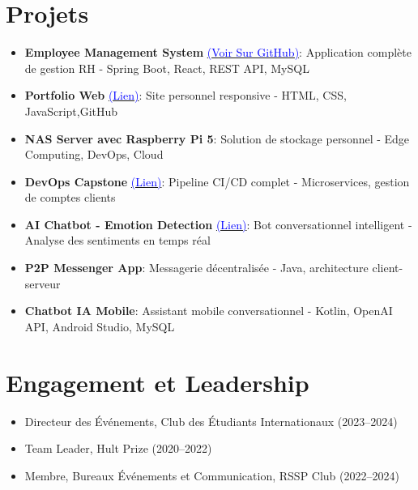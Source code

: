 \documentclass[10pt, letterpaper]{article}
\begin{document}
\section*{Projets}
\begin{itemize}[leftmargin=*, topsep=2pt, itemsep=1pt]
\item \textbf{Employee Management System} \href{https://github.com/MendDevs/employee-management-app-fullstack}{\textcolor{blue}{(Voir Sur GitHub)}}: Application complète de gestion RH - Spring Boot, React, REST API, MySQL
\item \textbf{Portfolio Web} \href{https://menddevs.github.io}{\textcolor{blue}{(Lien)}}: Site personnel responsive - HTML, CSS, JavaScript,GitHub
\item \textbf{NAS Server avec Raspberry Pi 5}: Solution de stockage personnel - Edge Computing, DevOps, Cloud
\item \textbf{DevOps Capstone} \href{https://github.com/MendDevs/devops-capstone-project}{\textcolor{blue}{(Lien)}}: Pipeline CI/CD complet - Microservices, gestion de comptes clients
\item \textbf{AI Chatbot - Emotion Detection} \href{https://github.com/MendDevs/final-project-embeded-ai}{\textcolor{blue}{(Lien)}}: Bot conversationnel intelligent - Analyse des sentiments en temps r\'eal
\item \textbf{P2P Messenger App}: Messagerie décentralisée - Java, architecture client-serveur
\item \textbf{Chatbot IA Mobile}: Assistant mobile conversationnel - Kotlin, OpenAI API, Android Studio, MySQL
\end{itemize}

\section*{Engagement et Leadership}
\begin{itemize}[leftmargin=*, topsep=2pt, itemsep=1pt]
\item Directeur des \'Ev\'enements, Club des \'Etudiants Internationaux (2023--2024)
\item Team Leader, Hult Prize (2020--2022)
\item Membre, Bureaux \'Ev\'enements et Communication, RSSP Club (2022--2024)
\end{itemize}
\end{document}
